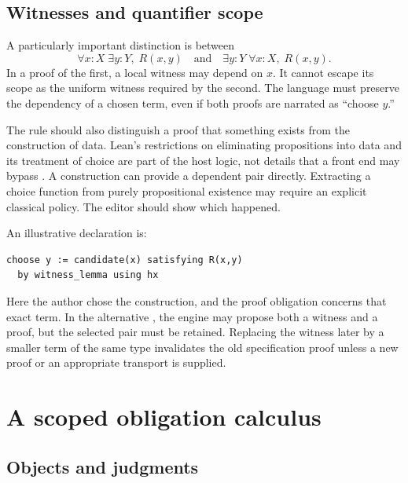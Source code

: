 \documentclass[11pt,letterpaper]{article}
\newcommand{\code}[1]{\texttt{\detokenize{#1}}}
\theoremstyle{remark}
\begin{document}
\subsection{Witnesses and quantifier scope}

A particularly important distinction is between
\[
 \forall x:X\;\exists y:Y,\;R(x,y)
 \quad\text{and}\quad
 \exists y:Y\;\forall x:X,\;R(x,y).
\]
In a proof of the first, a local witness may depend on $x$. It cannot escape its scope as the uniform witness required by the second. The language must preserve the dependency of a chosen term, even if both proofs are narrated as ``choose $y$.''

The rule should also distinguish a proof that something exists from the construction of data. Lean's restrictions on eliminating propositions into data and its treatment of choice are part of the host logic, not details that a front end may bypass \cite{lean-reference}. A construction can provide a dependent pair directly. Extracting a choice function from purely propositional existence may require an explicit classical policy. The editor should show which happened.

An illustrative declaration is:
\par\noindent\begin{minipage}{\linewidth}
\begin{lstlisting}[caption={Proposed witness syntax: a term and its specification remain linked.}]
choose y := candidate(x) satisfying R(x,y)
  by witness_lemma using hx
\end{lstlisting}
\end{minipage}\par
Here the author chose the construction, and the proof obligation concerns that exact term. In the alternative \code{choose y satisfying R(x,y) by search}, the engine may propose both a witness and a proof, but the selected pair must be retained. Replacing the witness later by a smaller term of the same type invalidates the old specification proof unless a new proof or an appropriate transport is supplied.

\section{A scoped obligation calculus}
\label{sec:semantics}

\subsection{Objects and judgments}
\end{document}
